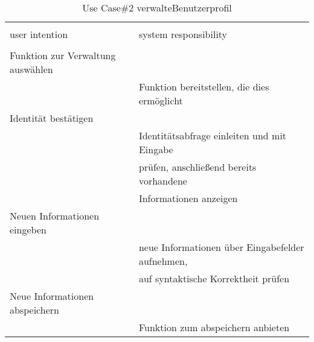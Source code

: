 \begin{table}[H]
\caption{Use Case\#2 verwalteBenutzerprofil }
\centering
\begin{tabular}{l l}
\\ [-0.5ex]

\hline\hline
\\ [-0.5ex]
user intention & system responsibility
\\ [1.5ex]
\hline
\\ [-0.5ex]
Funktion zur Verwaltung auswählen  	& 												 	\\[1ex]
									& Funktion bereitstellen, die dies ermöglicht	 	\\[1ex]
Identität bestätigen				& 											     	\\[1ex]
									& Identitätsabfrage einleiten und mit Eingabe    	\\[1ex]
									& prüfen, anschließend bereits vorhandene 		 	\\[1ex] 
									& Informationen anzeigen     				     	\\[1ex] 
Neuen Informationen eingeben 		& 											     	\\[1ex] 
									& neue Informationen über Eingabefelder aufnehmen, 	\\[1ex]
									& auf syntaktische Korrektheit prüfen				\\[1ex]
Neue Informationen abspeichern		& 											 		\\[1ex]
									& Funktion zum abspeichern anbieten					\\[1ex]
\hline
\end{tabular}
\label{tab:profilbearbeitenUC}
\end{table}

